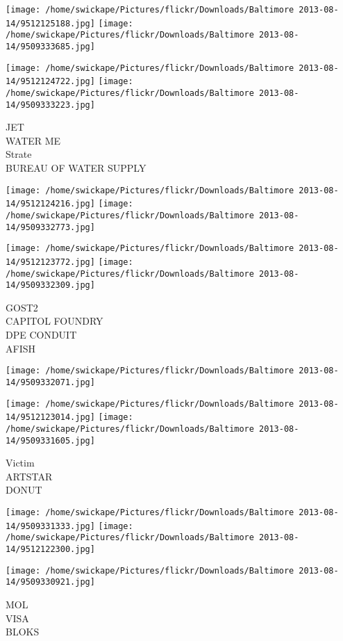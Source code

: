 \documentclass[10pt,letterpaper]{article}
\begin{document}
\texttt{[image: /home/swickape/Pictures/flickr/Downloads/Baltimore 2013-08-14/9512125188.jpg]}
\texttt{[image: /home/swickape/Pictures/flickr/Downloads/Baltimore 2013-08-14/9509333685.jpg]}

\texttt{[image: /home/swickape/Pictures/flickr/Downloads/Baltimore 2013-08-14/9512124722.jpg]}
\texttt{[image: /home/swickape/Pictures/flickr/Downloads/Baltimore 2013-08-14/9509333223.jpg]}

JET\\
WATER ME\\
Strate\\
BUREAU OF WATER SUPPLY
\pagebreak

\texttt{[image: /home/swickape/Pictures/flickr/Downloads/Baltimore 2013-08-14/9512124216.jpg]}
\texttt{[image: /home/swickape/Pictures/flickr/Downloads/Baltimore 2013-08-14/9509332773.jpg]}

\texttt{[image: /home/swickape/Pictures/flickr/Downloads/Baltimore 2013-08-14/9512123772.jpg]}
\texttt{[image: /home/swickape/Pictures/flickr/Downloads/Baltimore 2013-08-14/9509332309.jpg]}

GOST2\\
CAPITOL FOUNDRY\\
DPE CONDUIT\\
AFISH
\pagebreak

\texttt{[image: /home/swickape/Pictures/flickr/Downloads/Baltimore 2013-08-14/9509332071.jpg]}

\vspace{0.25in}
\texttt{[image: /home/swickape/Pictures/flickr/Downloads/Baltimore 2013-08-14/9512123014.jpg]}
\texttt{[image: /home/swickape/Pictures/flickr/Downloads/Baltimore 2013-08-14/9509331605.jpg]}

Victim\\
ARTSTAR\\
DONUT
\pagebreak

\texttt{[image: /home/swickape/Pictures/flickr/Downloads/Baltimore 2013-08-14/9509331333.jpg]}
\texttt{[image: /home/swickape/Pictures/flickr/Downloads/Baltimore 2013-08-14/9512122300.jpg]}

\texttt{[image: /home/swickape/Pictures/flickr/Downloads/Baltimore 2013-08-14/9509330921.jpg]}

MOL\\
VISA\\
BLOKS
\pagebreak
\end{document}
